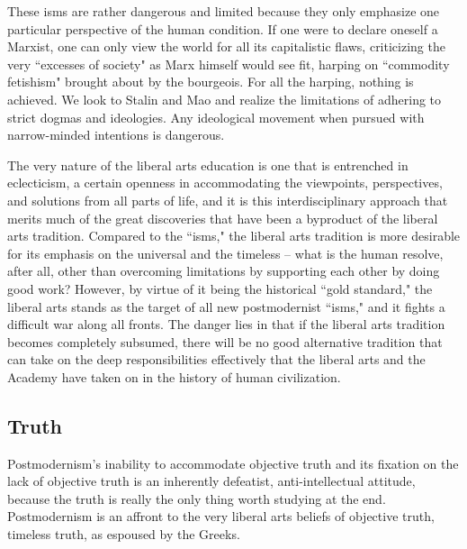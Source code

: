 \documentclass[12pt,letterpaper]{article}
\begin{document}
 These isms are rather dangerous and limited because they only emphasize one particular perspective of the human condition. If one were to declare oneself a Marxist, one can only view the world for all its capitalistic flaws, criticizing the very ``excesses of society" as Marx himself would see fit, harping on ``commodity fetishism" brought about by the bourgeois.  For all the harping, nothing is achieved.  We look to Stalin and Mao and realize the limitations of adhering to strict dogmas and ideologies.  Any ideological movement when pursued with narrow-minded intentions is dangerous.

The very nature of the liberal arts education is one that is entrenched in eclecticism, a certain openness in accommodating the viewpoints, perspectives, and solutions from all parts of life, and it is this interdisciplinary approach that merits much of the great discoveries that have been a byproduct of the liberal arts tradition.  Compared to the ``isms," the liberal arts tradition is more desirable for its emphasis on the universal and the timeless -- what is the human resolve, after all, other than overcoming limitations by supporting each other by doing good work? However, by virtue of it being the historical ``gold standard," the liberal arts stands as the target of all new postmodernist ``isms," and it fights a difficult war along all fronts.  The danger lies in that if the liberal arts tradition becomes completely subsumed, there will be no good alternative tradition that can take on the deep responsibilities effectively that the liberal arts and the Academy have taken on in the history of human civilization.



\subsection{Truth}
Postmodernism's inability to accommodate objective truth and its fixation on the lack of objective truth is an inherently defeatist, anti-intellectual attitude, because the truth is really the only thing worth studying at the end.  Postmodernism is an affront to the very liberal arts beliefs of objective truth, timeless truth, as espoused by the Greeks. 
\end{document}
